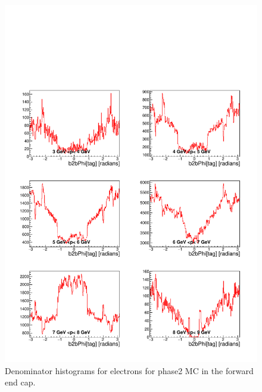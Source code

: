 \documentclass[a4paper,11pt,twosided,final,german,openbib,pdftex,listof=totoc,bibliography=totoc]{scrbook}
\begin{document}
\begin{appendix}
\begin{figure}[!htbp]
	\centering
	\includegraphics[width=\textwidth]{Plots/master/xPMPhiemFCD_MC}
	\caption[Momentum $\phi$ Electron Forward End Cap Denominator Histogram Phase2 MC]{Denominator histograms for electrons for phase2 MC in the forward end cap.}
	\label{plt:PMPhiemFCD_MC}
\end{figure}



\end{appendix}
\end{document}
